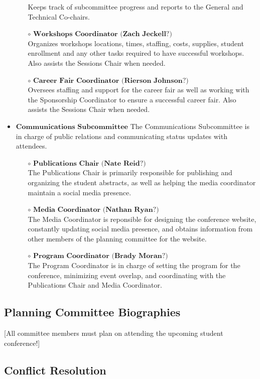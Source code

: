 \begin{itemize}
\begin{itemize}
		Keeps track of subcommittee progress and reports to the General and Technical Co-chairs.
		\item[$\circ$] $\textbf{Workshops Coordinator (Zach Jeckell?)}$\\
		Organizes workshops locations, times, staffing, costs, supplies, student enrollment
		and any other tasks required to have successful workshops. Also assists the Sessions Chair when needed.
		\item[$\circ$] $\textbf{Career Fair Coordinator (Rierson Johnson?)}$\\
		Oversees staffing and support for the career fair as well as working with the Sponsorship
		Coordinator to ensure a successful career fair. Also assists the Sessions Chair when needed.
	\end{itemize}
	\item $\textbf{Communications Subcommittee}$
	The Communications Subcommittee is in charge of public relations and communicating status updates with attendees.
	\begin{itemize}
		\item[$\circ$] $\textbf{Publications Chair (Nate Reid?)}$\\
		The Publications Chair is primarily responsible for publishing and organizing the student abstracts, as well as 
		helping the media coordinator maintain a social media presence. 
		\item[$\circ$] $\textbf{Media Coordinator (Nathan Ryan?)}$\\
		The Media Coordinator is reponsible for designing the conference website, constantly updating social media presence,
		and obtains information from other members of the planning committee for the website. 
		\item[$\circ$] $\textbf{Program Coordinator (Brady Moran?)}$\\
		The Program Coordinator is in charge of setting the program for the conference, minimizing event overlap, and coordinating
		with the Publications Chair and Media Coordinator.
	\end{itemize}
\end{itemize}

\subsection{Planning Committee Biographies}
[All committee members must plan on attending the upcoming student conference!]


\subsection{Conflict Resolution}

